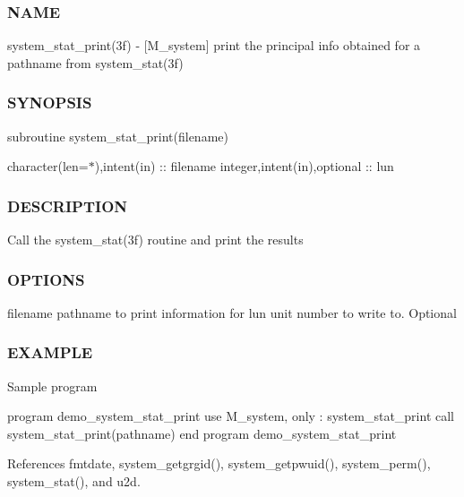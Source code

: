 \subsubsection*{N\+A\+ME}

system\+\_\+stat\+\_\+print(3f) -\/ \mbox{[}M\+\_\+system\mbox{]} print the principal info obtained for a pathname from system\+\_\+stat(3f) \subsubsection*{S\+Y\+N\+O\+P\+S\+IS}

subroutine system\+\_\+stat\+\_\+print(filename)

character(len=$\ast$),intent(in) \+:\+: filename integer,intent(in),optional \+:\+: lun \subsubsection*{D\+E\+S\+C\+R\+I\+P\+T\+I\+ON}

Call the system\+\_\+stat(3f) routine and print the results \subsubsection*{O\+P\+T\+I\+O\+NS}

filename pathname to print information for lun unit number to write to. Optional \subsubsection*{E\+X\+A\+M\+P\+LE}

Sample program

program demo\+\_\+system\+\_\+stat\+\_\+print use M\+\_\+system, only \+: system\+\_\+stat\+\_\+print call system\+\_\+stat\+\_\+print(pathname) end program demo\+\_\+system\+\_\+stat\+\_\+print 

References fmtdate, system\+\_\+getgrgid(), system\+\_\+getpwuid(), system\+\_\+perm(), system\+\_\+stat(), and u2d.

